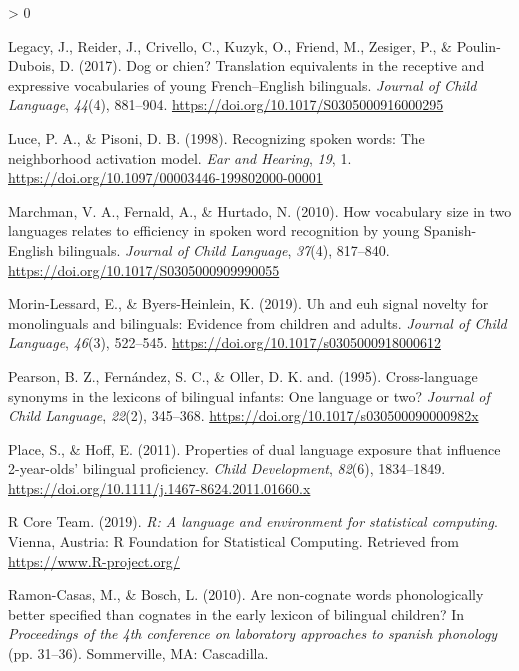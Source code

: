\documentclass[
  english,
  ,man,floatsintext]{apa6}
\newlength{\cslhangindent}
\newenvironment{CSLReferences}[2] %
 {%
  \setlength{\parindent}{0pt}
  \ifodd #1 \everypar{\setlength{\hangindent}{\cslhangindent}}\ignorespaces\fi
  \ifnum #2 > 0
  \setlength{\parskip}{#2\baselineskip}
  \fi
 }%
 {}
\begin{document}
\begin{CSLReferences}{1}{0}
\leavevmode\hypertarget{ref-Legacy_etal_2017}{}%
Legacy, J., Reider, J., Crivello, C., Kuzyk, O., Friend, M., Zesiger, P., \& Poulin-Dubois, D. (2017). Dog or chien? Translation equivalents in the receptive and expressive vocabularies of young {F}rench--{E}nglish bilinguals. \emph{Journal of Child Language}, \emph{44}(4), 881--904. \url{https://doi.org/10.1017/S0305000916000295}

\leavevmode\hypertarget{ref-Luce_Pisoni_1998}{}%
Luce, P. A., \& Pisoni, D. B. (1998). Recognizing spoken words: The neighborhood activation model. \emph{Ear and Hearing}, \emph{19}, 1. \url{https://doi.org/10.1097/00003446-199802000-00001}

\leavevmode\hypertarget{ref-Marchman_etal_2010}{}%
Marchman, V. A., Fernald, A., \& Hurtado, N. (2010). How vocabulary size in two languages relates to efficiency in spoken word recognition by young {S}panish-{E}nglish bilinguals. \emph{Journal of Child Language}, \emph{37}(4), 817--840. \url{https://doi.org/10.1017/S0305000909990055}

\leavevmode\hypertarget{ref-Morin-Lessard_Byers-Heinlein_2019}{}%
Morin-Lessard, E., \& Byers-Heinlein, K. (2019). Uh and euh signal novelty for monolinguals and bilinguals: Evidence from children and adults. \emph{Journal of Child Language}, \emph{46}(3), 522--545. \url{https://doi.org/10.1017/s0305000918000612}

\leavevmode\hypertarget{ref-Pearson_etal_1995}{}%
Pearson, B. Z., Fernández, S. C., \& Oller, D. K. and. (1995). Cross-language synonyms in the lexicons of bilingual infants: One language or two? \emph{Journal of Child Language}, \emph{22}(2), 345--368. \url{https://doi.org/10.1017/s030500090000982x}

\leavevmode\hypertarget{ref-Place_Hoff_2011}{}%
Place, S., \& Hoff, E. (2011). Properties of dual language exposure that influence 2-year-olds' bilingual proficiency. \emph{Child Development}, \emph{82}(6), 1834--1849. \url{https://doi.org/10.1111/j.1467-8624.2011.01660.x}

\leavevmode\hypertarget{ref-R_2019}{}%
R Core Team. (2019). \emph{R: A language and environment for statistical computing}. Vienna, Austria: R Foundation for Statistical Computing. Retrieved from \url{https://www.R-project.org/}

\leavevmode\hypertarget{ref-Ramon-Casas_Bosch_2010}{}%
Ramon-Casas, M., \& Bosch, L. (2010). Are non-cognate words phonologically better specified than cognates in the early lexicon of bilingual children? In \emph{Proceedings of the 4th conference on laboratory approaches to spanish phonology} (pp. 31--36). Sommerville, MA: Cascadilla.


\end{CSLReferences}
\end{document}
